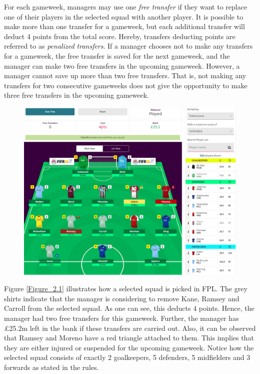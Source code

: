 \newpar

For each gameweek, managers may use one \textit{free transfer} if they want to replace one of their players in the selected squad with another player. It is possible to make more than one transfer for a gameweek, but each additional transfer will deduct 4 points from the total score. Hereby, transfers deducting points are referred to as \textit{penalized transfers}. If a manager chooses not to make any transfers for a gameweek, the free transfer is saved for the next gameweek, and the manager can make two free transfers in the upcoming gameweek. However, a manager cannot save up more than two free transfers. That is, not making any transfers for two consecutive gameweeks does not give the opportunity to make three free transfers in the upcoming gameweek.


\begin{figure}[H]
\centering
\includegraphics[scale=0.35]{fig/fantasyteam1.png}
\label{Figure_2.1}
\label{fig:fantasy_bilde}
\end{figure}

Figure \ref{Figure_2.1} illustrates how a selected squad is picked in FPL. The grey shirts indicate that the manager is considering to remove Kane, Ramsey and Carroll from the selected squad. As one can see, this deducts 4 points. Hence, the manager had two free transfers for this gameweek. Further, the manager has \pounds 25.2m left in the bank if these transfers are carried out. Also, it can be observed that Ramsey and Moreno have a red triangle attached to them. This implies that they are either injured or suspended for the upcoming gameweek. Notice how the selected squad consists of exactly 2 goalkeepers, 5 defenders, 5 midfielders and 3 forwards as stated in the rules.


